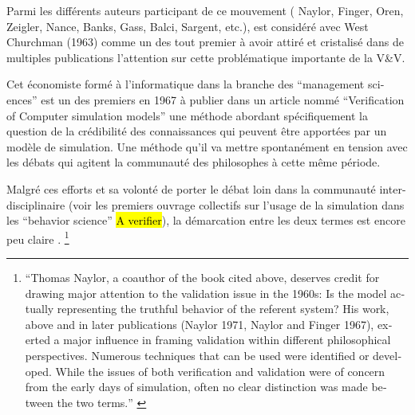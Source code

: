 
Parmi les différents auteurs participant de ce mouvement ( Naylor, Finger, Oren, Zeigler, Nance, Banks, Gass, Balci, Sargent, etc.), \textcite{Naylor1966} est considéré avec West Churchman (1963) comme un des tout premier à avoir attiré et cristalisé  dans de multiples publications l'attention sur cette problématique importante de la V\&V.

Cet économiste formé à l'informatique dans la branche des \foreignquote{english}{management sciences} \autocite{Stricklin1985} est un des premiers en 1967 \autocite{Naylor1967} à publier dans un article nommé \foreignquote{english}{Verification of Computer simulation models} une méthode abordant spécifiquement la question de la crédibilité des connaissances qui peuvent être apportées par un modèle de simulation. Une méthode qu'il va mettre spontanément en tension avec les débats qui agitent la communauté des philosophes à cette même période.

Malgré ces efforts et sa volonté de porter le débat loin dans la communauté inter-disciplinaire (voir les premiers ouvrage collectifs sur l'usage de la simulation dans les \enquote{behavior science} \autocite{Dutton1971, Guetzkow1972} \hl{A verifier}), la démarcation entre les deux termes est encore peu claire \autocites[165]{Nance2002}[3]{Balci1986}. \footnote{\foreignquote{english}{Thomas Naylor, a coauthor of the book cited above, deserves credit for drawing major attention to the validation issue in the 1960s: Is the model actually representing the truthful behavior of the referent system? His work, above and in later publications (Naylor 1971, Naylor and Finger 1967), exerted a major influence in framing validation within different philosophical perspectives. Numerous techniques that can be used were identified or developed. While the issues of both verification and validation were of concern from the early days of simulation, often no clear distinction was made between the two terms.} \autocite[165]{Nance2002}}



